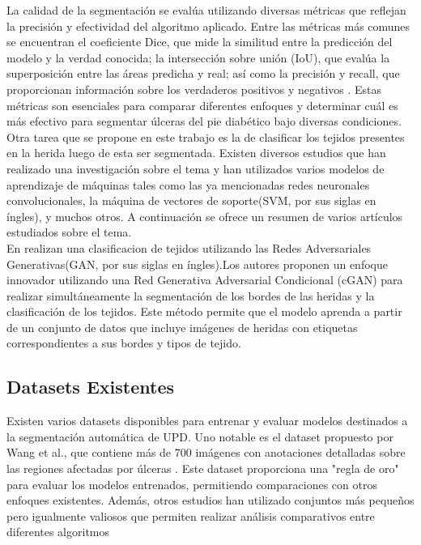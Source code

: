 \documentclass[12pt]{article}
\begin{document}
	
	
		
		La calidad de la segmentación se evalúa utilizando diversas métricas que reflejan la precisión y efectividad del algoritmo aplicado. Entre las métricas más comunes se encuentran el coeficiente Dice, que mide la similitud entre la predicción del modelo y la verdad conocida; la intersección sobre unión (IoU), que evalúa la superposición entre las áreas predicha y real; así como la precisión y recall, que proporcionan información sobre los verdaderos positivos y negativos \cite{BVS2019}. Estas métricas son esenciales para comparar diferentes enfoques y determinar cuál es más efectivo para segmentar úlceras del pie diabético bajo diversas condiciones.
		\\
		
		Otra tarea que se propone en este trabajo es la de clasificar los tejidos presentes en la herida luego de esta ser segmentada. Existen diversos estudios que han realizado una investigaci\'on sobre el tema y han utilizados varios modelos de aprendizaje de m\'aquinas tales como las ya mencionadas redes neuronales convolucionales, la m\'aquina de vectores de soporte(SVM, por sus siglas en \'ingles), y muchos otros. A continuaci\'on se ofrece un resumen de varios art\'iculos estudiados sobre el tema.
		\\
		
		En \cite{sarp2021simultaneous} realizan una clasificacion de tejidos utilizando las Redes Adversariales Generativas(GAN, por sus siglas en \'ingles).Los autores proponen un enfoque innovador utilizando una Red Generativa Adversarial Condicional (cGAN) para realizar simultáneamente la segmentación de los bordes de las heridas y la clasificación de los tejidos. Este método permite que el modelo aprenda a partir de un conjunto de datos que incluye imágenes de heridas con etiquetas correspondientes a sus bordes y tipos de tejido.
			
		
		
		\subsection{Datasets Existentes}
		Existen varios datasets disponibles para entrenar y evaluar modelos destinados a la segmentación automática de UPD. Uno notable es el dataset propuesto por Wang et al., que contiene más de 700 imágenes con anotaciones detalladas sobre las regiones afectadas por úlceras \cite{Wang2020}. Este dataset proporciona una "regla de oro" para evaluar los modelos entrenados, permitiendo comparaciones con otros enfoques existentes. Además, otros estudios han utilizado conjuntos más pequeños pero igualmente valiosos que permiten realizar análisis comparativos entre diferentes algoritmos \cite{Gomez2021}
		
\end{document}
